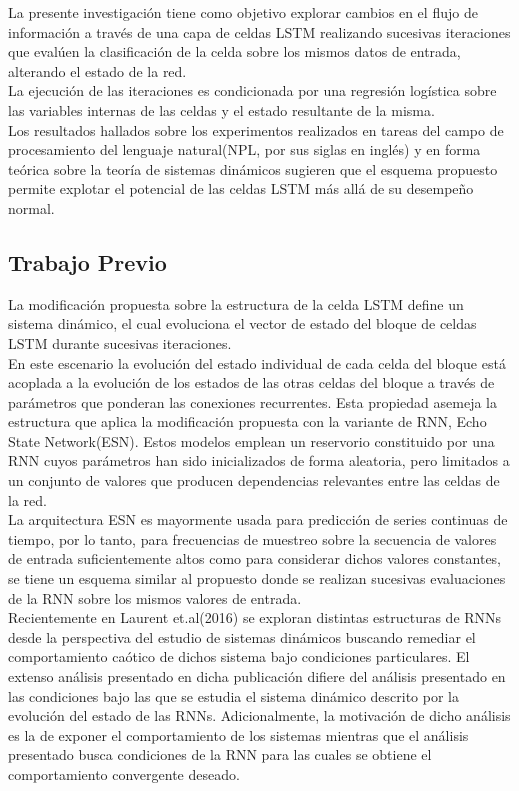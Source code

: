 \documentclass{article}
\begin{document}
	La presente investigación tiene como objetivo explorar cambios en el flujo de información a través de una capa de celdas LSTM realizando sucesivas iteraciones que evalúen la clasificación de la celda sobre los mismos datos de entrada, alterando el estado de la red. \\
	La ejecución de las iteraciones es condicionada por una regresión logística sobre las variables internas de las celdas y el estado resultante de la misma.\\
	Los resultados hallados sobre los experimentos realizados en tareas del campo de procesamiento del lenguaje natural(NPL, por sus siglas en inglés) y en forma teórica sobre la teoría de sistemas dinámicos sugieren que el esquema propuesto permite explotar el potencial de las celdas LSTM más allá de su desempeño normal.
	
	\subsection{Trabajo Previo}
	La modificación propuesta sobre la estructura de la celda LSTM define un sistema dinámico, el cual evoluciona el vector de estado del bloque de celdas LSTM durante sucesivas iteraciones. \\
	En este escenario la evolución del estado individual de cada celda del bloque está acoplada a la evolución de los estados de las otras celdas del bloque a través de parámetros que ponderan las conexiones recurrentes. Esta propiedad asemeja la estructura que aplica la modificación propuesta con la variante de RNN, Echo State Network(ESN). Estos modelos emplean un reservorio constituido por una RNN cuyos parámetros han sido inicializados de forma aleatoria, pero limitados a un conjunto de valores que producen dependencias relevantes entre las celdas de la red.\\
	La arquitectura ESN es mayormente usada para predicción de series continuas de tiempo, por lo tanto, para frecuencias de muestreo sobre la secuencia de valores de entrada suficientemente altos como para considerar dichos valores constantes, se tiene un esquema similar al propuesto donde se realizan sucesivas evaluaciones de la RNN sobre los mismos valores de entrada.\\
	
	Recientemente en Laurent et.al(2016)\cite{11Laurent} se exploran distintas estructuras de RNNs desde la perspectiva del estudio de sistemas dinámicos buscando remediar el comportamiento caótico de dichos sistema bajo condiciones particulares. El extenso análisis presentado en dicha publicación difiere del análisis presentado en las condiciones bajo las que se estudia el sistema dinámico descrito por la evolución del estado de las RNNs. Adicionalmente, la motivación de dicho análisis es la de exponer el comportamiento de los sistemas mientras que el análisis presentado busca condiciones de la RNN para las cuales se obtiene el comportamiento convergente deseado.\\
	
\end{document}
